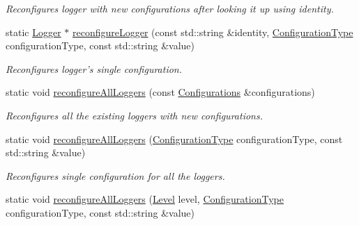 \begin{DoxyCompactItemize}
\begin{DoxyCompactList}\small\item\em Reconfigures logger with new configurations after looking it up using identity. \end{DoxyCompactList}\item 
\hypertarget{classel_1_1Loggers_aef49fdae329cefcc1c01428568dced4b}{static \hyperlink{classel_1_1Logger}{Logger} $\ast$ \hyperlink{classel_1_1Loggers_aef49fdae329cefcc1c01428568dced4b}{reconfigure\-Logger} (const std\-::string \&identity, \hyperlink{namespaceel_a281f5db6d6163678bc68a8b23b59e124}{Configuration\-Type} configuration\-Type, const std\-::string \&value)}\label{classel_1_1Loggers_aef49fdae329cefcc1c01428568dced4b}

\begin{DoxyCompactList}\small\item\em Reconfigures logger's single configuration. \end{DoxyCompactList}\item 
\hypertarget{classel_1_1Loggers_ac834df0f5e9e3dab18e70321a2543af7}{static void \hyperlink{classel_1_1Loggers_ac834df0f5e9e3dab18e70321a2543af7}{reconfigure\-All\-Loggers} (const \hyperlink{classel_1_1Configurations}{Configurations} \&configurations)}\label{classel_1_1Loggers_ac834df0f5e9e3dab18e70321a2543af7}

\begin{DoxyCompactList}\small\item\em Reconfigures all the existing loggers with new configurations. \end{DoxyCompactList}\item 
\hypertarget{classel_1_1Loggers_a1ebd33bc0208b430f41508e34509c7c9}{static void \hyperlink{classel_1_1Loggers_a1ebd33bc0208b430f41508e34509c7c9}{reconfigure\-All\-Loggers} (\hyperlink{namespaceel_a281f5db6d6163678bc68a8b23b59e124}{Configuration\-Type} configuration\-Type, const std\-::string \&value)}\label{classel_1_1Loggers_a1ebd33bc0208b430f41508e34509c7c9}

\begin{DoxyCompactList}\small\item\em Reconfigures single configuration for all the loggers. \end{DoxyCompactList}\item 
\hypertarget{classel_1_1Loggers_ab24b99e5bb3c907d1418ee3266f15397}{static void \hyperlink{classel_1_1Loggers_ab24b99e5bb3c907d1418ee3266f15397}{reconfigure\-All\-Loggers} (\hyperlink{namespaceel_ab0ac6091262344c52dd2d3ad099e8e36}{Level} level, \hyperlink{namespaceel_a281f5db6d6163678bc68a8b23b59e124}{Configuration\-Type} configuration\-Type, const std\-::string \&value)}\label{classel_1_1Loggers_ab24b99e5bb3c907d1418ee3266f15397}


\end{DoxyCompactItemize}
